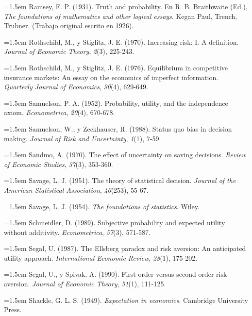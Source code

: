 \documentclass[10pt,a4paper]{article}
\begin{document}
\noindent\hangindent=1.5em Ramsey, F. P. (1931). Truth and probability. En R. B. Braithwaite (Ed.), \textit{The foundations of mathematics and other logical essays}. Kegan Paul, Trench, Trubner. (Trabajo original escrito en 1926).

\noindent\hangindent=1.5em Rothschild, M., y Stiglitz, J. E. (1970). Increasing risk: I. A definition. \textit{Journal of Economic Theory}, \textit{2}(3), 225-243.

\noindent\hangindent=1.5em Rothschild, M., y Stiglitz, J. E. (1976). Equilibrium in competitive insurance markets: An essay on the economics of imperfect information. \textit{Quarterly Journal of Economics}, \textit{90}(4), 629-649.

\noindent\hangindent=1.5em Samuelson, P. A. (1952). Probability, utility, and the independence axiom. \textit{Econometrica}, \textit{20}(4), 670-678.

\noindent\hangindent=1.5em Samuelson, W., y Zeckhauser, R. (1988). Status quo bias in decision making. \textit{Journal of Risk and Uncertainty}, \textit{1}(1), 7-59.

\noindent\hangindent=1.5em Sandmo, A. (1970). The effect of uncertainty on saving decisions. \textit{Review of Economic Studies}, \textit{37}(3), 353-360.

\noindent\hangindent=1.5em Savage, L. J. (1951). The theory of statistical decision. \textit{Journal of the American Statistical Association}, \textit{46}(253), 55-67.

\noindent\hangindent=1.5em Savage, L. J. (1954). \textit{The foundations of statistics}. Wiley.

\noindent\hangindent=1.5em Schmeidler, D. (1989). Subjective probability and expected utility without additivity. \textit{Econometrica}, \textit{57}(3), 571-587.

\noindent\hangindent=1.5em Segal, U. (1987). The Ellsberg paradox and risk aversion: An anticipated utility approach. \textit{International Economic Review}, \textit{28}(1), 175-202.

\noindent\hangindent=1.5em Segal, U., y Spivak, A. (1990). First order versus second order risk aversion. \textit{Journal of Economic Theory}, \textit{51}(1), 111-125.

\noindent\hangindent=1.5em Shackle, G. L. S. (1949). \textit{Expectation in economics}. Cambridge University Press.
\end{document}
